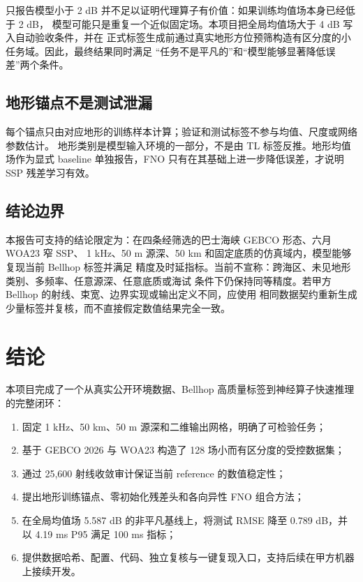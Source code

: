 \documentclass[UTF8,11pt]{ctexart}
\newcommand{\BestRMSE}{0.789}
\newcommand{\GlobalBaseline}{5.587}
\newcommand{\GpuPninetyfive}{4.19}
\begin{document}
只报告模型小于 2 dB 并不足以证明代理算子有价值：如果训练均值场本身已经低于 2 dB，
模型可能只是重复一个近似固定场。本项目把全局均值场大于 4 dB 写入自动验收条件，并在
正式标签生成前通过真实地形方位预筛构造有区分度的小任务域。因此，最终结果同时满足
“任务不是平凡的”和“模型能够显著降低误差”两个条件。

\subsection{地形锚点不是测试泄漏}

每个锚点只由对应地形的训练样本计算；验证和测试标签不参与均值、尺度或网络参数估计。
地形类别是模型输入环境的一部分，不是由 TL 标签反推。地形均值场作为显式 baseline
单独报告，FNO 只有在其基础上进一步降低误差，才说明 SSP 残差学习有效。

\subsection{结论边界}

本报告可支持的结论限定为：在四条经筛选的巴士海峡 GEBCO 形态、六月 WOA23 窄 SSP、
1 kHz、50 m 源深、50 km 和固定底质的仿真域内，模型能够复现当前 Bellhop 标签并满足
精度及时延指标。当前不宣称：跨海区、未见地形类别、多频率、任意源深、任意底质或海试
条件下仍保持同等精度。若甲方 Bellhop 的射线、束宽、边界实现或输出定义不同，应使用
相同数据契约重新生成少量标签并复核，而不直接假定数值结果完全一致。

\section{结论}

本项目完成了一个从真实公开环境数据、Bellhop 高质量标签到神经算子快速推理的完整闭环：
\begin{enumerate}
  \item 固定 1 kHz、50 km、50 m 源深和二维输出网格，明确了可检验任务；
  \item 基于 GEBCO 2026 与 WOA23 构造了 128 场小而有区分度的受控数据集；
  \item 通过 25,600 射线收敛审计保证当前 reference 的数值稳定性；
  \item 提出地形训练锚点、零初始化残差头和各向异性 FNO 组合方法；
  \item 在全局均值场 \GlobalBaseline{} dB 的非平凡基线上，将测试 RMSE 降至
  \BestRMSE{} dB，并以 \GpuPninetyfive{} ms P95 满足 100 ms 指标；
  \item 提供数据哈希、配置、代码、独立复核与一键复现入口，支持后续在甲方机器上接续开发。
\end{enumerate}
\end{document}
